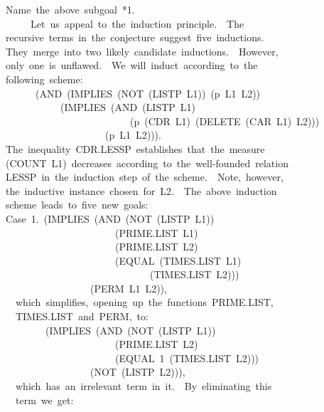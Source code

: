 \documentclass[11pt]{book}
\newenvironment{pubasis}{\begin{flushleft}\ttfamily\small}{\normalsize\rmfamily\end{flushleft}}
\begin{document}
\begin{pubasis}
Name~the~above~subgoal~*1.\\

~~~~~Let~us~appeal~to~the~induction~principle.~~The\\
recursive~terms~in~the~conjecture~suggest~five~inductions.\\
They~merge~into~two~likely~candidate~inductions.~~However,\\
only~one~is~unflawed.~~We~will~induct~according~to~the\\
following~scheme:\\
~~~~~~(AND~(IMPLIES~(NOT~(LISTP~L1))~(p~L1~L2))\\
~~~~~~~~~~~(IMPLIES~(AND~(LISTP~L1)\\
~~~~~~~~~~~~~~~~~~~~~~~~~(p~(CDR~L1)~(DELETE~(CAR~L1)~L2)))\\
~~~~~~~~~~~~~~~~~~~~(p~L1~L2))).\\
The~inequality~CDR.LESSP~establishes~that~the~measure\\
(COUNT~L1)~decreases~according~to~the~well-founded~relation\\
LESSP~in~the~induction~step~of~the~scheme.~~Note,~however,\\
the~inductive~instance~chosen~for~L2.~~The~above~induction\\
scheme~leads~to~five~new~goals:\\

Case~1.~(IMPLIES~(AND~(NOT~(LISTP~L1))\\
~~~~~~~~~~~~~~~~~~~~~~(PRIME.LIST~L1)\\
~~~~~~~~~~~~~~~~~~~~~~(PRIME.LIST~L2)\\
~~~~~~~~~~~~~~~~~~~~~~(EQUAL~(TIMES.LIST~L1)\\
~~~~~~~~~~~~~~~~~~~~~~~~~~~~~(TIMES.LIST~L2)))\\
~~~~~~~~~~~~~~~~~(PERM~L1~L2)),\\

~~which~simplifies,~opening~up~the~functions~PRIME.LIST,\\
~~TIMES.LIST~and~PERM,~to:\\

~~~~~~~~(IMPLIES~(AND~(NOT~(LISTP~L1))\\
~~~~~~~~~~~~~~~~~~~~~~(PRIME.LIST~L2)\\
~~~~~~~~~~~~~~~~~~~~~~(EQUAL~1~(TIMES.LIST~L2)))\\
~~~~~~~~~~~~~~~~~(NOT~(LISTP~L2))),\\

~~which~has~an~irrelevant~term~in~it.~~By~eliminating~this\\
~~term~we~get:\\


\end{pubasis}
\end{document}
